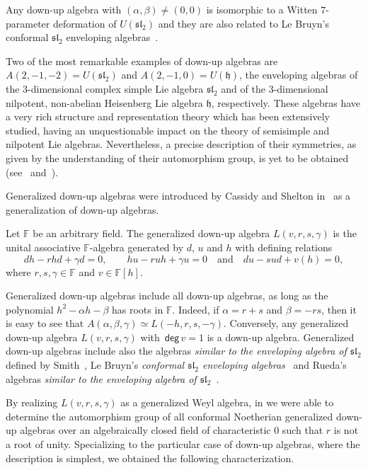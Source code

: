\documentclass{commat}
\newcommand{\FF}{\mathbb{F}}
\newcommand\degg{\, \mathsf{deg} \,}
\begin{document}
Any down-up algebra with $(\alpha, \beta)\neq (0,0)$ is isomorphic to a Witten $7$-parameter deformation of $U(\mathfrak{sl}_{2})$ and they are also related to Le Bruyn's conformal $\mathfrak{sl}_{2}$ enveloping algebras~\cite{lLB95}.

Two of the most remarkable examples of down-up algebras are $A(2,-1,-2)=U(\mathfrak{sl}_{2})$ and 
$A(2,-1,0)=U(\mathfrak{h})$, the enveloping algebras of the $3$-dimensional complex simple Lie algebra 
$\mathfrak{sl}_{2}$ and of the $3$-dimensional nilpotent, non-abelian Heisenberg Lie algebra 
$\mathfrak{h}$, respectively. These algebras have a very rich structure and representation theory which has been extensively studied, having an unquestionable impact on the theory of semisimple and nilpotent Lie algebras. Nevertheless, a precise description of their symmetries, as given by the understanding of their automorphism group, is yet to be obtained (see~\cite{jD68, jD73} and~\cite{aJ76, jA86}).

Generalized down-up algebras were introduced by Cassidy and Shelton in~\cite{CS04} as a generalization of down-up algebras. 



\begin{definition}\label{D:def:gdua}
	Let $\FF$ be an arbitrary field. The generalized down-up algebra $L(v,r,s,\gamma)$ is the unital associative $\FF$-algebra generated by $d$, $u$ and $h$ with defining relations
	\begin{equation*}
		dh-rhd +\gamma d =0, \quad \quad hu-ruh +\gamma u=0 \quad \mbox{and}\quad du-sud +v(h)=0,
	\end{equation*}
	where $r, s, \gamma\in\FF$ and $v\in\FF[h]$.
\end{definition}


Generalized down-up algebras include all down-up algebras, as long as the polynomial $h^2-\alpha h-\beta$ has roots in $\FF$. Indeed, if $\alpha=r+s$ and $\beta=-rs$, then it is easy to see that $A(\alpha, \beta, \gamma)\simeq L(-h,r,s,-\gamma)$. Conversely, any generalized down-up algebra $L(v,r,s,\gamma)$ with $\degg v=1$ is a down-up algebra. Generalized down-up algebras include also the algebras \emph{similar to the enveloping algebra of $\mathfrak{sl}_{2}$} defined by Smith~\cite{spS90}, Le Bruyn's \emph{conformal $\mathfrak{sl}_{2}$ enveloping algebras}~\cite{lLB95} and Rueda's algebras \emph{similar to the enveloping algebra of $\mathfrak{sl}_{2}$}~\cite{sR02}. 

By realizing $L(v,r,s,\gamma)$ as a generalized Weyl algebra, in \cite{CL09} we were able to determine the automorphism group of all conformal Noetherian generalized down-up algebras over an algebraically closed field of characteristic $0$ such that $r$ is not a root of unity. Specializing to the particular case of down-up algebras, where the description is simplest, we obtained the following characterization.
\end{document}
